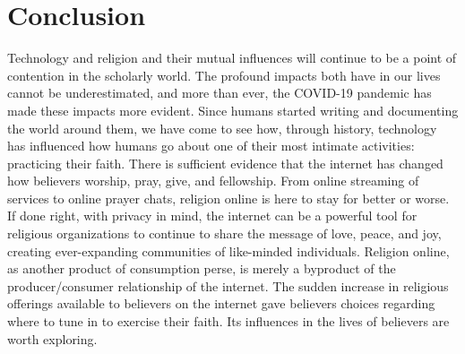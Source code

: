 \section{Conclusion}
\label{sec:conclusion}
Technology and religion and their mutual influences will continue to be a point of contention in the scholarly world. The profound impacts both have in our lives cannot be underestimated, and more than ever, the COVID-19 pandemic has made these impacts more evident. Since humans started writing and documenting the world around them, we have come to see how, through history, technology has influenced how humans go about one of their most intimate activities: practicing their faith. There is sufficient evidence that the internet has changed how believers worship, pray, give, and fellowship. From online streaming of services to online prayer chats, religion online is here to stay for better or worse. If done right, with privacy in mind, the internet can be a powerful tool for religious organizations to continue to share the message of love, peace, and joy, creating ever-expanding communities of like-minded individuals. Religion online, as another product of consumption perse, is merely a byproduct of the producer/consumer relationship of the internet. The sudden increase in religious offerings available to believers on the internet gave believers choices regarding where to tune in to exercise their faith. Its influences in the lives of believers are worth exploring.  






